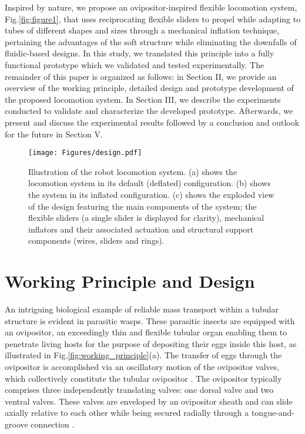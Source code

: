 \documentclass[letterpaper, 10 pt, conference]{ieeeconf}  %
\begin{document}
Inspired by nature, we propose an ovipositor-inspired flexible locomotion system, Fig.\ref{fig:figure1}, that uses reciprocating flexible sliders to propel while adapting to tubes of different shapes and sizes through a mechanical inflation technique, pertaining the advantages of the soft structure while eliminating the downfalls of fluidic-based designs. In this study, we translated this principle into a fully functional prototype which we validated and tested experimentally. The remainder of this paper is organized as follows: in Section II, we provide an overview of the working principle, detailed design and prototype development of the proposed locomotion system. In Section III, we describe the experiments conducted to validate and characterize the developed prototype. Afterwards, we present and discuss the experimental results followed by a conclusion and outlook for the future in Section V.

\begin{figure*}
    \centering
    \texttt{[image: Figures/design.pdf]}
\caption{Illustration of the robot locomotion system. (a) shows the locomotion system in its default (deflated) configuration. (b) shows the system in its inflated configuration. (c) shows the exploded view of the design featuring the main components of the system; the flexible sliders (a single slider is displayed for clarity), mechanical inflators and their associated actuation and structural support components (wires, sliders and rings).}
    \label{fig:design}
\end{figure*}

\section{Working Principle and Design}
An intriguing biological example of reliable mass transport within a tubular structure is evident in parasitic wasps. These parasitic insects are equipped with an ovipositor, an exceedingly thin and flexible tubular organ enabling them to penetrate living hosts for the purpose of depositing their eggs inside this host, as illustrated in Fig.\ref{fig:working_principle}(a). The transfer of eggs through the ovipositor is accomplished via an oscillatory motion of the ovipositor valves, which collectively constitute the tubular ovipositor \cite{AUSTIN,cerkvenik,Meer}. The ovipositor typically comprises three independently translating valves: one dorsal valve and two ventral valves. These valves are enveloped by an ovipositor sheath and can slide axially relative to each other while being secured radially through a tongue-and-groove connection \cite{AHMED}.
\end{document}
